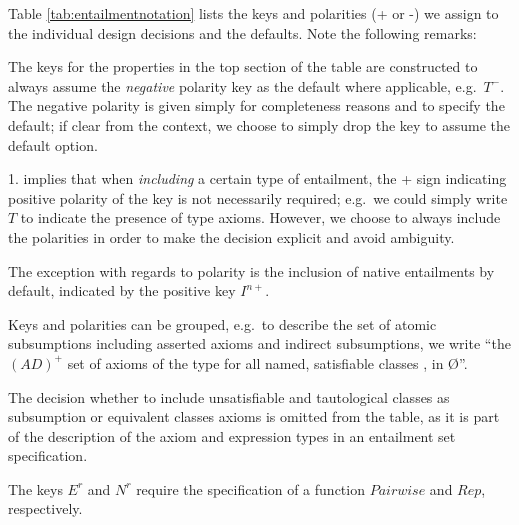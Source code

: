 Table \ref{tab:entailmentnotation} lists the keys and polarities (+ or -) we assign to the individual design decisions and the defaults. Note the following remarks:
\begin{compactenum}
\item The keys for the properties in the top section of the table are constructed to always assume the \emph{negative} polarity key as the default where applicable, e.g.\ $T^{-}$. The negative polarity is given simply for completeness reasons and to specify the default; if clear from the context, we choose to simply drop the key to assume the default option.
\item 1. implies that when \emph{including} a certain type of entailment, the + sign indicating positive polarity of the key is not necessarily required; e.g.\ we could simply write $T$ to indicate the presence of  type axioms. However, we choose to always include the polarities in order to make the decision explicit and avoid ambiguity.
\item The exception with regards to polarity is the inclusion of native entailments by default, indicated by the positive  key $I^{n+} $.
\item Keys and polarities can be grouped, e.g.\ to describe the set of atomic subsumptions including asserted axioms and indirect subsumptions, we write \enquote{the $(AD)^{+}$ set of axioms of the type  for all named, satisfiable classes ,  in \O}.
\item The decision whether to include unsatisfiable and tautological classes as subsumption or equivalent classes  axioms is omitted from the table, as it is part of the description of the axiom and expression types in an entailment set specification.
\item The keys $E^{r}$ and $N^{r}$ require the specification of a function $Pairwise$ and $Rep$, respectively.
\end{compactenum}


